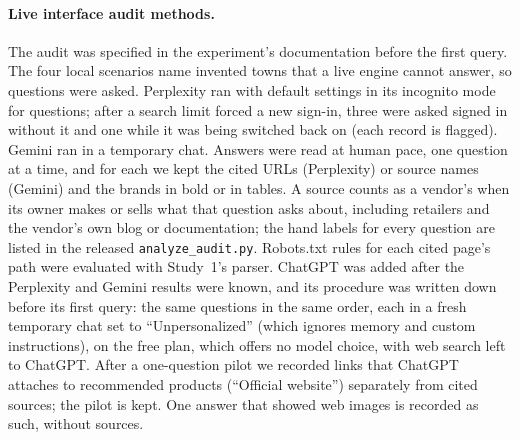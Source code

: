 \begin{table}[htbp]
\centering\small
\caption{Long pages and temperature 1: pooled effects on mentions (percentage points; 95\% CI for the robustness
version), and the change in each effect (robustness minus main, paired within trial). ${}^{*}$Holm-adjusted
$p<0.05$ across the treatments in each check. ``Main'' uses the same models and trials as the check.}
\label{tab:robust}
\resizebox{\linewidth}{!}{}
\end{table}

\begin{table}[htbp]
\centering\small
\caption{The absorption detector against two model judges, for \RJudgeN{} answers that named the target (120 per
edit) and \RJudgeNBase{} paired baseline answers that never saw the added content. ``Repeated'': share of answers
labelled as passing on the added content (\%); ``False pos.'': share of baseline answers labelled so (\%);
$\kappa$: Cohen's kappa between detector and judge. The judges agreed with each other at $\kappa =
\RJudgeKappaBetween$.}
\label{tab:judge}

\end{table}

\paragraph{Live interface audit methods.} The audit was specified in the experiment's documentation before the first query. The four
local scenarios name invented towns that a live engine cannot answer, so \AudNQW{} questions were asked. Perplexity
ran with default settings in its incognito mode for \AudPIncog{} questions; after a search limit forced a new sign-in,
three were asked signed in without it and one while it was being switched back on (each record is flagged). Gemini
ran in a temporary chat. Answers were read at human pace, one question at a
time, and for each we kept the cited URLs (Perplexity) or source names (Gemini) and the brands in bold or in tables.
A source counts as a vendor's when its owner makes or sells what that question asks about, including retailers and
the vendor's own blog or documentation; the hand labels for every question are listed in the released
\texttt{analyze\_audit.py}. Robots.txt rules for each cited page's path were evaluated with Study~1's parser.
ChatGPT was added after the Perplexity and Gemini results were known, and its procedure was written down before its
first query: the same \AudCNQW{} questions in the same order, each in a fresh temporary chat set to
``Unpersonalized'' (which ignores memory and custom instructions), on the free plan, which offers no model choice, with
web search left to ChatGPT. After a one-question pilot we recorded links that ChatGPT attaches to recommended products
(``Official website'') separately from cited sources; the pilot is kept. One answer that showed web images is recorded
as such, without sources.

